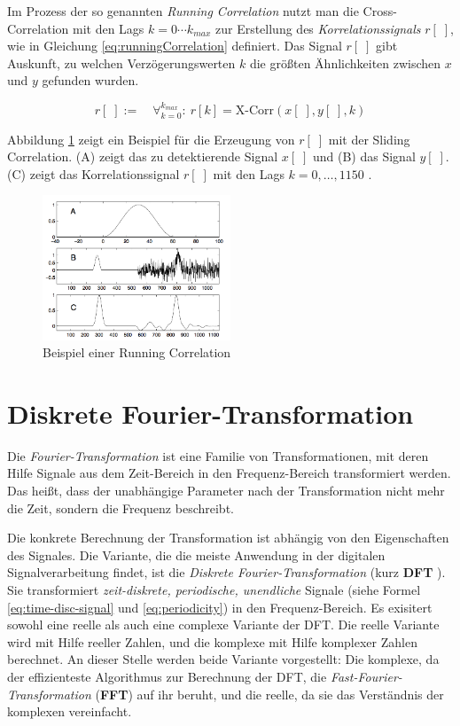 Im Prozess der so genannten \emph{Running Correlation} nutzt man die Cross-Correlation mit den Lags $k = 0 \cdots k_{max}$ zur Erstellung des \emph{Korrelationssignals} $r[\;]$, wie in Gleichung \ref{eq:runningCorrelation} definiert. Das Signal $r[\;]$ gibt Auskunft, zu welchen Verzögerungswerten $k$ die größten Ähnlichkeiten zwischen $x$ und $y$ gefunden wurden. 

\begin{equation}
r[\;] := \quad \mathop{\forall}_{k = 0}^{k_{max}} :\ r[k] = \text{X-Corr}(x[\;],y[\;],k)
\label{eq:runningCorrelation}
\end{equation}

Abbildung \ref{img:slidingCorrelation} zeigt ein Beispiel für die Erzeugung von $r[\;]$ mit der Sliding Correlation. (A) zeigt das zu detektierende Signal $x[\;]$ und (B) das Signal $y[\;]$. (C) zeigt das Korrelationssignal $r[\;]$ mit den Lags $k = 0, \ldots ,1150$ . \cite[S. 47 - 48]{dspMichigan}

\begin{figure}[h]
	\centering
	\includegraphics[width=0.5\textwidth]{bilder/slidingCorrelation.png}
	\caption{Beispiel einer Running Correlation}
	\label{img:slidingCorrelation}
\end{figure}


\section{Diskrete Fourier-Transformation}

Die \emph{Fourier-Transformation} ist eine Familie von Transformationen, mit deren Hilfe Signale aus dem Zeit-Bereich in den Frequenz-Bereich transformiert werden. Das heißt, dass der unabhängige Parameter nach der Transformation nicht mehr die Zeit, sondern die Frequenz beschreibt. 

Die konkrete Berechnung der Transformation ist abhängig von den Eigenschaften des Signales. Die Variante, die die meiste Anwendung in der digitalen Signalverarbeitung findet, ist die \emph{Diskrete Fourier-Transformation} (kurz \textbf{DFT} ). Sie transformiert \emph{zeit-diskrete, periodische, unendliche} Signale (siehe Formel \ref{eq:time-disc-signal} und \ref{eq:periodicity}) in den Frequenz-Bereich. Es exisitert sowohl eine reelle als auch eine complexe Variante der DFT. Die reelle Variante wird mit Hilfe reeller Zahlen, und die komplexe mit Hilfe komplexer Zahlen berechnet. An dieser Stelle werden beide Variante vorgestellt: Die komplexe, da der effizienteste Algorithmus zur Berechnung der DFT, die \emph{Fast-Fourier-Transformation} (\textbf{FFT}) auf ihr beruht, und die reelle, da sie das Verständnis der komplexen vereinfacht.\cite[S. 142 - 146]{dspGuide}

